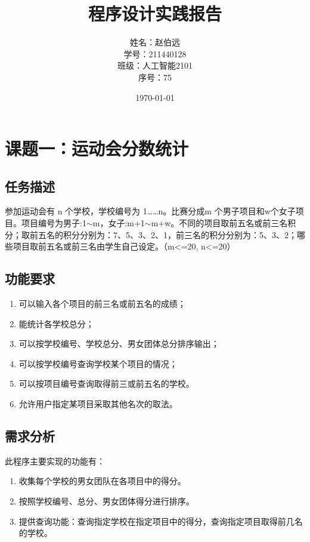 \documentclass[UTF8,titlepage]{ctexart}
\numberwithin{figure}{section}
\begin{document}
\title{{\Huge{\textbf{程序设计实践报告}}}}
\author{姓名：赵伯远 \\ 学号：211440128 \\班级：人工智能2101 \\ 序号：75}
\date{\today}
\maketitle
\tableofcontents
\clearpage

\section{课题一：运动会分数统计}

\subsection{任务描述}

参加运动会有 n 个学校，学校编号为 1……n。比赛分成m 个男子项目和w个女子项目。项目编号为男子:1$\sim$m，女子:m+1$\sim$m+w。不同的项目取前五名或前三名积分；取前五名的积分分别为：7、5、3、2、1，前三名的积分分别为：5、3、2；哪些项目取前五名或前三名由学生自己设定。（m<=20, n<=20）
 
\subsection{功能要求}

\begin{enumerate}
    \item 可以输入各个项目的前三名或前五名的成绩；
    \item 能统计各学校总分；
    \item 可以按学校编号、学校总分、男女团体总分排序输出；
    \item 可以按学校编号查询学校某个项目的情况；
    \item 可以按项目编号查询取得前三或前五名的学校。
    \item 允许用户指定某项目采取其他名次的取法。
    \end{enumerate}

\subsection{需求分析}
此程序主要实现的功能有：
\begin{enumerate}
    \item 收集每个学校的男女团队在各项目中的得分。
    \item 按照学校编号、总分、男女团体得分进行排序。
    \item 提供查询功能：查询指定学校在指定项目中的得分，查询指定项目取得前几名的学校。
\end{enumerate}
\end{document}
